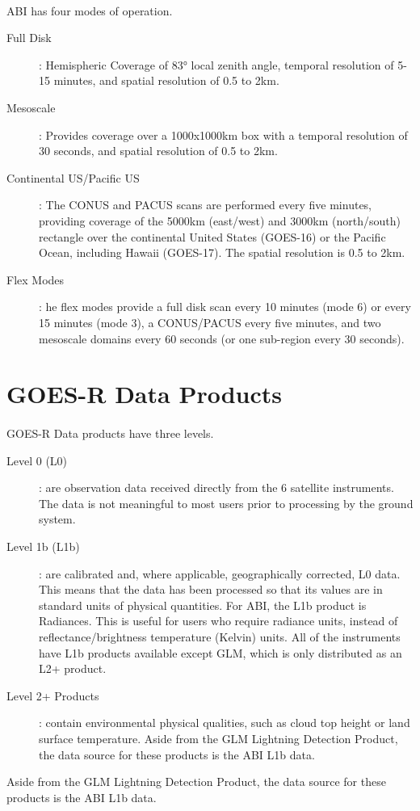 \paragraph{}
ABI has four modes of operation.
\begin{description}
\item[Full Disk] : Hemispheric Coverage of 83° local zenith angle, temporal resolution of 5-15 minutes, and spatial resolution of 0.5 to 2km.
\item[ Mesoscale]: Provides coverage over a 1000x1000km box with a temporal resolution of 30 seconds, and spatial resolution of 0.5 to 2km.
\item[ Continental US/Pacific US]: The CONUS and PACUS scans are performed every five minutes, providing coverage of the 5000km (east/west) and 3000km (north/south) rectangle over the continental United States (GOES-16) or the Pacific Ocean, including Hawaii (GOES-17). The spatial resolution is 0.5 to 2km.
\item[ Flex Modes]: he flex modes provide a full disk scan every 10 minutes (mode 6) or every 15 minutes (mode 3), a CONUS/PACUS every five minutes, and two mesoscale domains every 60 seconds (or one sub-region every 30 seconds).
\end{description}

\section{GOES-R Data Products}
\paragraph{}
GOES-R Data products have three levels.
\begin{description}
\item [Level 0 (L0)] : are observation data received directly from the 6 satellite instruments. The data is not meaningful to most users prior to processing by the ground system.
\item [Level 1b (L1b)] : are calibrated and, where applicable, geographically corrected, L0 data. This means that the data has been processed so that its values are in standard units of physical quantities. For ABI, the L1b product is Radiances.
This is useful for users who require radiance units, instead of reflectance/brightness temperature (Kelvin) units.
All of the instruments have L1b products available except GLM, which is only distributed as an L2+ product.
\item [Level 2+ Products] : contain environmental physical qualities, such as cloud top height or land surface temperature.
Aside from the GLM Lightning Detection Product, the data source for these products is the ABI L1b data.
\end{description}
Aside from the GLM Lightning Detection Product, the data source for these products is the ABI L1b data.

